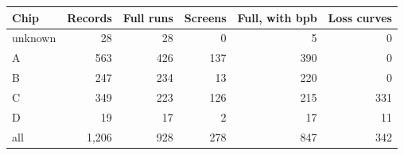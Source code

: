 {\small
\begin{tabular}{@{}lrrrrr@{}}
\toprule
Chip & Records & Full runs & Screens & Full, with bpb & Loss curves \\
\midrule
unknown & 28 & 28 & 0 & 5 & 0 \\
A & 563 & 426 & 137 & 390 & 0 \\
B & 247 & 234 & 13 & 220 & 0 \\
C & 349 & 223 & 126 & 215 & 331 \\
D & 19 & 17 & 2 & 17 & 11 \\
\midrule
all & 1{,}206 & 928 & 278 & 847 & 342 \\
\bottomrule
\end{tabular}
}
